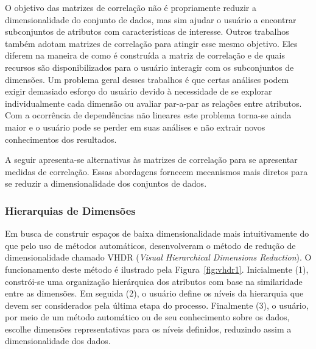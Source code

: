 O objetivo das matrizes de correlação não é propriamente
reduzir a dimensionalidade do conjunto de dados, mas sim
ajudar o usuário a encontrar subconjuntos de atributos com
características de interesse. Outros trabalhos
\cite{Friendly2002,MacEachren2003,RBF2004,May2011ss,Johansson2009,Ingram2010,May2011}
também adotam matrizes de correlação para atingir esse mesmo
objetivo. Eles diferem na maneira de como é construída a
matriz de correlação e de quais recursos são
disponibilizados para o usuário interagir com os
subconjuntos de dimensões. Um problema geral desses
trabalhos é que certas análises podem exigir demasiado
esforço do usuário devido à necessidade de se explorar
individualmente cada dimensão ou avaliar par-a-par as
relações entre atributos. Com a ocorrência de dependências
não lineares este problema torna-se ainda maior e o usuário
pode se perder em suas análises e não extrair novos
conhecimentos dos resultados. 

A seguir apresenta-se alternativas às matrizes de correlação
para se apresentar medidas de correlação. Essas abordagens
fornecem mecanismos mais diretos para se reduzir a
dimensionalidade dos conjuntos de dados. 

\subsubsection{Hierarquias de Dimensões}

Em busca de construir espaços de baixa dimensionalidade mais
intuitivamente do que pelo uso de métodos automáticos,
\citet{Yang2003} desenvolveram o método de redução de
dimensionalidade chamado VHDR (\emph{Visual Hierarchical
Dimensions Reduction}). O funcionamento deste método é
ilustrado pela Figura~\ref{fig:vhdr1}. Inicialmente (1),
constrói-se uma organização hierárquica dos atributos com
base na similaridade entre as dimensões. Em seguida (2), o
usuário define os níveis da hierarquia que devem ser
considerados pela última etapa do processo. Finalmente (3), o
usuário, por meio de um método automático ou de seu
conhecimento sobre os dados, escolhe dimensões
representativas para os níveis definidos, reduzindo assim a
dimensionalidade dos dados. 

